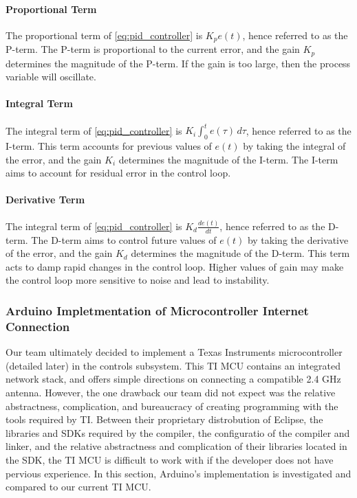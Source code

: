 \paragraph{Proportional Term} The proportional term of \autoref{eq:pid_controller} is $K_pe(t)$, hence referred to as the P-term. The P-term is proportional to the current error, and the gain $K_p$ determines the magnitude of the P-term. If the gain is too large, then the process variable will oscillate.

\paragraph{Integral Term} The integral term of \autoref{eq:pid_controller} is $K_i\int_{0}^{t}e(\tau) \, d\tau$, hence referred to as the I-term. This term accounts for previous values of $e(t)$ by taking the integral of the error, and the gain $K_i$ determines the magnitude of the I-term. The I-term aims to account for residual error in the control loop.

\paragraph{Derivative Term} The integral term of \autoref{eq:pid_controller} is $K_d\frac{de(t)}{dt}$, hence referred to as the D-term. The D-term aims to control future values of $e(t)$ by taking the derivative of the error, and the gain $K_d$ determines the magnitude of the D-term. This term acts to damp rapid changes in the control loop. Higher values of gain may make the control loop more sensitive to noise and lead to instability.

\subsubsection{Arduino Impletmentation of Microcontroller Internet Connection} Our team ultimately decided to implement a Texas Instruments microcontroller (detailed later) in the controls subsystem. This TI MCU contains an integrated network stack, and offers simple directions on connecting a compatible 2.4 GHz antenna. However, the one drawback our team did not expect was the relative abstractness, complication, and bureaucracy of creating programming with the tools required by TI. Between their proprietary distrobution of Eclipse, the libraries and SDKs required by the compiler, the configuratio of the compiler and linker, and the relative abstractness and complication of their libraries located in the SDK, the TI MCU is difficult to work with if the developer does not have pervious experience. In this section, Arduino's implementation is investigated and compared to our current TI MCU.

